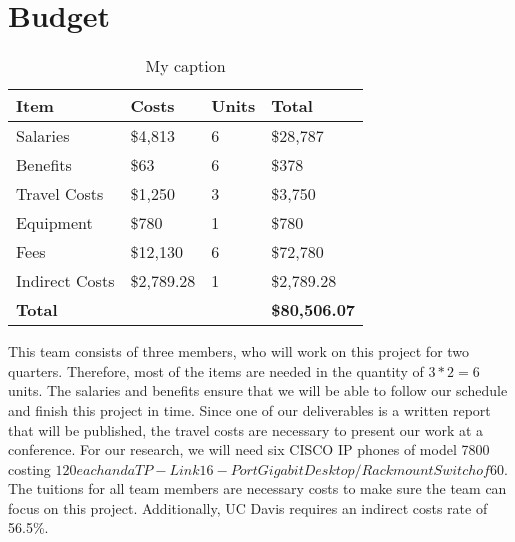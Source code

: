 \section{Budget}

\begin{table}[]
\centering
\caption{My caption}
\label{my-label}
\begin{tabular}{|l|l|l|l|}
\hline
\textbf{Item}  & \textbf{Costs} & \textbf{Units} & \textbf{Total}        \\ \hline
Salaries       & \$4,813        & 6              & \$28,787              \\ \hline
Benefits       & \$63           & 6              & \$378                 \\ \hline
Travel Costs   & \$1,250        & 3              & \$3,750               \\ \hline
Equipment      & \$780          & 1              & \$780                 \\ \hline
Fees           & \$12,130       & 6              & \$72,780              \\ \hline
Indirect Costs & \$2,789.28     & 1              & \$2,789.28           \\ \hline
\textbf{Total} &                &                & \textbf{\$80,506.07} \\ \hline
\end{tabular}
\end{table}

This team consists of three members, who will work on this project for two quarters. Therefore, most of the items are needed in the quantity of $3*2=6$ units. The salaries and benefits ensure that we will be able to follow our schedule and finish this project in time. Since one of our deliverables is a written report that will be published, the travel costs are necessary to present our work at a conference. For our research, we will need six CISCO IP phones of model 7800 costing $120 each and a TP-Link 16-Port Gigabit Desktop/Rackmount Switch of $60. The tuitions for all team members are necessary costs to make sure the team can focus on this project. Additionally, UC Davis requires an indirect costs rate of 56.5\%.
